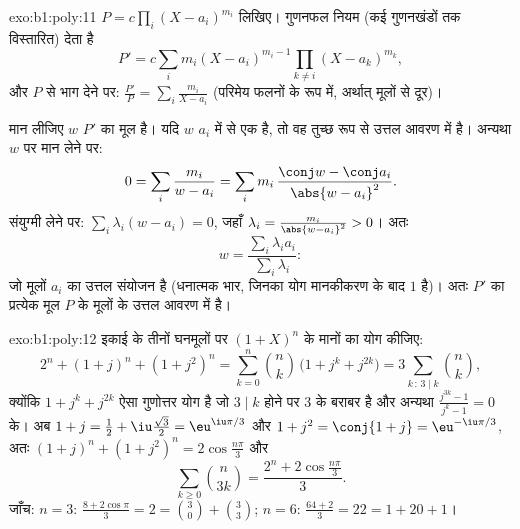 \begin{solution}{exo:b1:poly:11}
$P = c\prod_i (X - a_i)^{m_i}$ लिखिए। गुणनफल नियम (कई गुणनखंडों तक
विस्तारित) देता है
\[
P' = c\sum_{i} m_i (X - a_i)^{m_i - 1} \prod_{k \neq i} (X -
a_k)^{m_k},
\]
और $P$ से भाग देने पर: $\frac{P'}{P} = \sum_i \frac{m_i}{X - a_i}$ (परिमेय
फलनों के रूप में, अर्थात् मूलों से दूर)।

मान लीजिए $w$ $P'$ का मूल है। यदि $w$ $a_i$ में से एक है, तो वह तुच्छ रूप से
उत्तल आवरण में है। अन्यथा $w$ पर मान लेने पर:
\[
0 = \sum_i \frac{m_i}{w - a_i}
= \sum_i m_i\, \frac{\conj w - \conj a_i}{\abs{w - a_i}^2} .
\]
संयुग्मी लेने पर: $\sum_i \lambda_i (w - a_i) = 0$, जहाँ $\lambda_i =
\frac{m_i}{\abs{w - a_i}^2} > 0$। अतः
\[
w = \frac{\sum_i \lambda_i a_i}{\sum_i \lambda_i} :
\]
जो मूलों $a_i$ का उत्तल संयोजन है (धनात्मक भार, जिनका योग मानकीकरण के बाद
$1$ है)। अतः $P'$ का प्रत्येक मूल $P$ के मूलों के उत्तल आवरण में है।
\end{solution}

\begin{solution}{exo:b1:poly:12}
इकाई के तीनों घनमूलों पर $(1 + X)^n$ के मानों का योग कीजिए:
\[
2^n + (1 + j)^n + (1 + j^2)^n
= \sum_{k=0}^n \binom nk\,\bigl(1 + j^k + j^{2k}\bigr)
= 3\sum_{k\,:\,3\mid k}\binom nk ,
\]
क्योंकि $1 + j^k + j^{2k}$ ऐसा गुणोत्तर योग है जो $3 \mid k$ होने पर $3$ के
बराबर है और अन्यथा $\frac{j^{3k} - 1}{j^k - 1} = 0$ के। अब $1 + j = \frac12
+ \iu\frac{\sqrt3}2 = \eu^{\iu\pi/3}$ और $1 + j^2 = \conj{1 + j} =
\eu^{-\iu\pi/3}$, अतः $(1+j)^n + (1+j^2)^n = 2\cos\frac{n\pi}3$ और
\[
\sum_{k\geq0}\binom n{3k} = \frac{2^n + 2\cos\frac{n\pi}3}{3} .
\]
जाँच: $n = 3$: $\frac{8 + 2\cos\pi}3 = 2 = \binom30 + \binom33$; $n = 6$:
$\frac{64 + 2}3 = 22 = 1 + 20 + 1$।
\end{solution}

